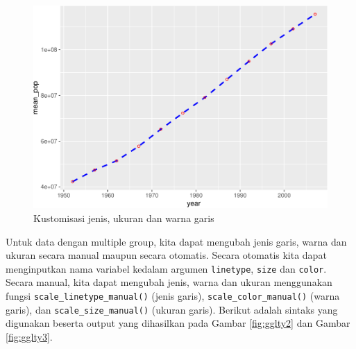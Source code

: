 \documentclass[]{book}
\newenvironment{Shaded}{\begin{snugshade}}{\end{snugshade}}
\newcommand{\KeywordTok}[1]{\textcolor[rgb]{0.13,0.29,0.53}{\textbf{#1}}}
\newcommand{\DataTypeTok}[1]{\textcolor[rgb]{0.13,0.29,0.53}{#1}}
\newcommand{\DecValTok}[1]{\textcolor[rgb]{0.00,0.00,0.81}{#1}}
\newcommand{\StringTok}[1]{\textcolor[rgb]{0.31,0.60,0.02}{#1}}
\newcommand{\CommentTok}[1]{\textcolor[rgb]{0.56,0.35,0.01}{\textit{#1}}}
\newcommand{\OperatorTok}[1]{\textcolor[rgb]{0.81,0.36,0.00}{\textbf{#1}}}
\newcommand{\NormalTok}[1]{#1}
\begin{document}
\begin{figure}

{\centering \includegraphics[width=0.7\linewidth]{EnvStat_files/figure-latex/gglty-1} 

}

\caption{Kustomisasi jenis, ukuran dan warna garis}\label{fig:gglty}
\end{figure}

Untuk data dengan multiple group, kita dapat mengubah jenis garis, warna
dan ukuran secara manual maupun secara otomatis. Secara otomatis kita
dapat menginputkan nama variabel kedalam argumen \texttt{linetype},
\texttt{size} dan \texttt{color}. Secara manual, kita dapat mengubah
jenis, warna dan ukuran menggunakan fungsi
\texttt{scale\_linetype\_manual()} (jenis garis),
\texttt{scale\_color\_manual()} (warna garis), dan
\texttt{scale\_size\_manual()} (ukuran garis). Berikut adalah sintaks
yang digunakan beserta output yang dihasilkan pada Gambar
\ref{fig:gglty2} dan Gambar \ref{fig:gglty3}.

\begin{Shaded}
\end{Shaded}
\end{document}
